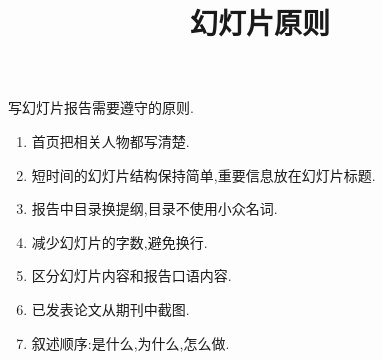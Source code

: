 \documentclass[a4paper]{book}
\makeatletter
\newcommand{\voidenvironment}[1]{%
\expandafter\providecommand\csname env@#1@save@env\endcsname{}%
\expandafter\providecommand\csname env@#1@process\endcsname{}%
\@ifundefined{#1}{}{\RenewEnviron{#1}{}}%
}
\numberwithin{equation}{chapter}
\theoremstyle{definition}
\makeatother
\begin{document}
\pagestyle{empty}




\setcounter{chapter}{0}




\title{幻灯片原则}
写幻灯片报告需要遵守的原则.
\begin{enumerate}
  \item 首页把相关人物都写清楚.
  \item 短时间的幻灯片结构保持简单,重要信息放在幻灯片标题.
  \item 报告中目录换提纲,目录不使用小众名词.
  \item 减少幻灯片的字数,避免换行.
  \item 区分幻灯片内容和报告口语内容.
  \item 已发表论文从期刊中截图.
  \item 叙述顺序:是什么,为什么,怎么做.
\end{enumerate}
  
\end{document}
